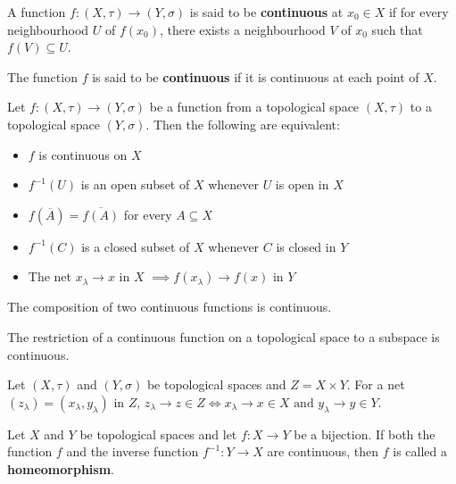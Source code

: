 \begin{defn}
    A function $f:(X, \tau) \to (Y, \sigma)$ is said to be \textbf{continuous} at $x_0 \in X$ if for every neighbourhood $U$ of $f(x_0)$, there exists a neighbourhood $V$ of $x_0$ such that $f(V) \subseteq U$.

    The function $f$ is said to be \textbf{continuous} if it is continuous at each point of $X$.
\end{defn}

\begin{thm}
    Let $f:(X,\tau) \to (Y, \sigma)$ be a function from a topological space $(X,\tau)$ to a topological space $(Y,\sigma)$. Then the following are equivalent:
    \begin{itemize}
        \item $f$ is continuous on $X$
        \item $f^{-1}(U)$ is an open subset of $X$ whenever $U$ is open in $X$
        \item $f(\overline{A}) = \overline{f(A)}$ for every $A \subseteq X$
        \item $f^{-1}(C)$ is a closed subset of $X$ whenever $C$ is closed in $Y$
        \item The net $x_\lambda \to x$ in $X$ $\implies f(x_\lambda) \to f(x)$ in $Y$
    \end{itemize}
\end{thm}

\begin{thm}
    The composition of two continuous functions is continuous.
\end{thm}

\begin{thm}
    The restriction of a continuous function on a topological space to a subspace is continuous.
\end{thm}

\begin{thm}
    Let $(X, \tau)$ and $(Y, \sigma)$ be topological spaces and $Z = X \times Y$. 
    For a net $(z_\lambda) = (x_\lambda, y_\lambda)$ in $Z$, $z_\lambda \to z \in Z \iff x_\lambda \to x \in X \text{ and } y_\lambda \to y \in Y$.
\end{thm}

\begin{defn}
    Let $X$ and $Y$ be topological spaces and let $f: X \to Y$ be a bijection. If both the function $f$ and the inverse function $f^{-1}: Y \to X$ are continuous, then $f$ is called a \textbf{homeomorphism}.
\end{defn}

\hhrule

